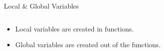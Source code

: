         \begin{frame}{Local \& Global Variables}
            \begin{columns}
                \begin{column}{0.50\textwidth}
                    \begin{itemize}
                        \item Local variables are created in functions.
                        \item Global variables are created out of the functions.
                    \end{itemize}
                    \inputminted[frame=single,framesep=2pt, lastline=15]{python3}{code-examples/var.py}
                \end{column}
                \begin{column}{0.50\textwidth}
                    \inputminted[frame=single,framesep=2pt, lastline=15]{python3}{code-examples/var2.py}                    
                    \inputminted[frame=single,framesep=2pt, lastline=15]{python3}{code-examples/var3.py}                    
                \end{column}
            \end{columns}
        \end{frame}
